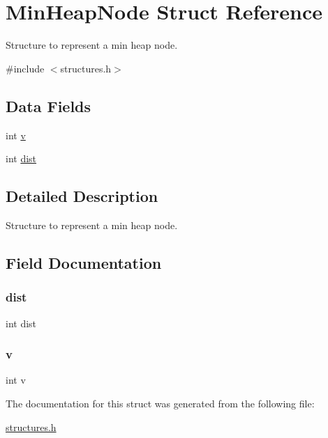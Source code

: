 \hypertarget{struct_min_heap_node}{}\section{Min\+Heap\+Node Struct Reference}
\label{struct_min_heap_node}


Structure to represent a min heap node.  




{\ttfamily \#include $<$structures.\+h$>$}

\subsection*{Data Fields}
\begin{DoxyCompactItemize}
\item 
int \mbox{\hyperlink{struct_min_heap_node_ac8859e8c1ce357c4c8b37bbb1936ba1c}{v}}
\item 
int \mbox{\hyperlink{struct_min_heap_node_a62d19f1b68cc51e55723b31a29cdef78}{dist}}
\end{DoxyCompactItemize}


\subsection{Detailed Description}
Structure to represent a min heap node. 

\subsection{Field Documentation}
\mbox{\label{struct_min_heap_node_a62d19f1b68cc51e55723b31a29cdef78}} 
\subsubsection{\texorpdfstring{dist}{dist}}
{\footnotesize\ttfamily int dist}

\mbox{\label{struct_min_heap_node_ac8859e8c1ce357c4c8b37bbb1936ba1c}} 
\subsubsection{\texorpdfstring{v}{v}}
{\footnotesize\ttfamily int v}



The documentation for this struct was generated from the following file\+:\begin{DoxyCompactItemize}
\item 
\mbox{\hyperlink{structures_8h}{structures.\+h}}\end{DoxyCompactItemize}
